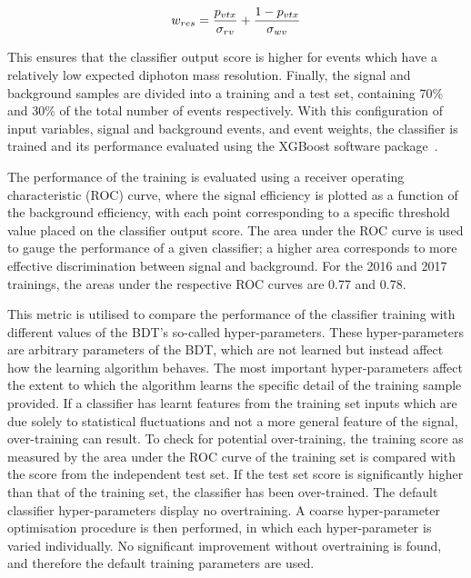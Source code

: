 \begin{equation}
  w_{res} = \frac{p_{vtx}}{\sigma_{rv}} + \frac{1-p_{vtx}}{\sigma_{wv}}
\end{equation}

This ensures that the classifier output score is higher for events 
which have a relatively low expected diphoton mass resolution.
Finally, the signal and background samples are divided into a training and a test set,
containing 70\% and 30\% of the total number of events respectively.
With this configuration of input variables, signal and background events, and event weights, 
the classifier is trained and its performance evaluated using the XGBoost software package~\cite{XGBoost}.

The performance of the training is evaluated using a receiver operating characteristic (ROC) curve, 
where the signal efficiency is plotted as a function of the background efficiency,
with each point corresponding to a specific threshold value placed on the classifier output score.
The area under the ROC curve is used to gauge the performance of a given classifier; 
a higher area corresponds to more effective discrimination between signal and background.
For the 2016 and 2017 trainings, the areas under the respective ROC curves are 0.77 and 0.78.

This metric is utilised to compare the performance of the classifier training 
with different values of the BDT's so-called hyper-parameters.
These hyper-parameters are arbitrary parameters of the BDT, 
which are not learned but instead affect how the learning algorithm behaves.
The most important hyper-parameters affect the extent to which 
the algorithm learns the specific detail of the training sample provided.
If a classifier has learnt features from the training set inputs
which are due solely to statistical fluctuations and not a more general feature of the signal, 
over-training can result.
To check for potential over-training, the training score as measured by the area under the ROC curve 
of the training set is compared with the score from the independent test set.
If the test set score is significantly higher than that of the training set, 
the classifier has been over-trained.
The default classifier hyper-parameters display no overtraining.
A coarse hyper-parameter optimisation procedure is then performed, 
in which each hyper-parameter is varied individually.
No significant improvement without overtraining is found, 
and therefore the default training parameters are used.

